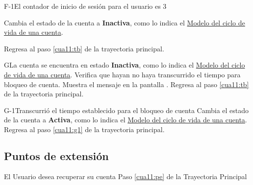  \begin{UCtrayectoriaA}{F-1}{El contador de inicio de sesión para el usuario es 3}
	
	\UCpaso[\UCsist] Cambia el estado de la cuenta a \textbf{Inactiva}, como lo indica el \hyperlink{cv:Cuenta}{Modelo del ciclo de vida de una cuenta}.
	
	\UCpaso[] Regresa al paso \ref{cua11:tb} de la trayectoria principal. 
	
	
\end{UCtrayectoriaA}


\begin{UCtrayectoriaA}{G}{La cuenta se encuentra en estado \textbf{Inactiva}, como lo indica el \hyperlink{cv:Cuenta}{Modelo del ciclo de vida de una cuenta}.}
	\UCpaso[\UCsist] Verifica que hayan no haya transcurrido el tiempo para bloqueo de cuenta.
	\UCpaso[\UCsist] Muestra el mensaje  en la pantalla .
	\UCpaso[] Regresa al paso \ref{cua11:tb} de la trayectoria principal. 
	
\end{UCtrayectoriaA}

\begin{UCtrayectoriaA}{G-1}{Transcurrió el tiempo establecido para el bloqueo de cuenta}
	\UCpaso[\UCsist] Cambia el estado de la cuenta a \textbf{Activa}, como lo indica el \hyperlink{cv:Cuenta}{Modelo del ciclo de vida de una cuenta}.
	\UCpaso[] Regresa al paso \ref{cua11:g1} de la trayectoria principal. 
	
\end{UCtrayectoriaA}


\subsection{Puntos de extensión}

\UCExtensionPoint
{El Usuario desea recuperar su cuenta}
{ Paso \ref{cua11:pe} de la Trayectoria Principal}
{}

